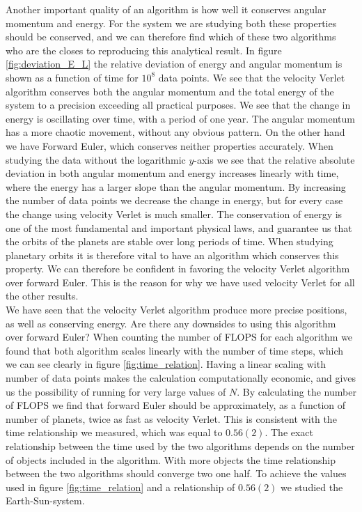\documentclass[%
 reprint,
nofootinbib,
aps,
]{revtex4-1}
\begin{document}
Another important quality of an algorithm is how well it conserves angular momentum and energy. For the system we are studying both these properties should be conserved, and we can therefore find which of these two algorithms who are the closes to reproducing this analytical result. In figure \vref{fig:deviation_E_L} the relative deviation of energy and angular momentum is shown as a function of time for $10^{8}$ data points. We see that the velocity Verlet algorithm conserves both the angular momentum and the total energy of the system to a precision exceeding all practical purposes. We see that the change in energy is oscillating over time, with a period of one year. The angular momentum has a more chaotic movement, without any obvious pattern. On the other hand we have Forward Euler, which conserves neither properties accurately. When studying the data without the logarithmic $y$-axis we see that the relative absolute deviation in both angular momentum and energy increases linearly with time, where the energy has a larger slope than the angular momentum. By increasing the number of data points we decrease the change in energy, but for every case the change using velocity Verlet is much smaller. The conservation of energy is one of the most fundamental and important physical laws, and guarantee us that the orbits of the planets are stable over long periods of time. When studying planetary orbits it is therefore vital to have an algorithm which conserves this property. We can therefore be confident in favoring the velocity Verlet algorithm over forward Euler. This is the reason for why we have used velocity Verlet for all the other results.\\
We have seen that the velocity Verlet algorithm produce more precise positions, as well as conserving energy. Are there any downsides to using this algorithm over forward Euler? When counting the number of FLOPS for each algorithm we found that both algorithm scales linearly with the number of time steps, which we can see clearly in figure \vref{fig:time_relation}. Having a linear scaling with number of data points makes the calculation computationally economic, and gives us the possibility of running for very large values of $N$. By calculating the number of FLOPS we find that forward Euler should be approximately, as a function of number of planets, twice as fast as velocity Verlet. This is consistent with the time relationship we measured, which was equal to $0.56(2)$. The exact relationship between the time used by the two algorithms depends on the number of objects included in the algorithm. With more objects the time relationship between the two algorithms should converge two one half. To achieve the values used in figure \vref{fig:time_relation} and a relationship of $0.56(2)$ we studied the Earth-Sun-system.\par
\end{document}
